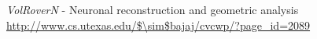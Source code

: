 \documentclass[margin,line]{res}
\begin{document}
\begin{resume}
\emph{VolRoverN} - Neuronal reconstruction and geometric analysis\\
\url{http://www.cs.utexas.edu/$\sim$bajaj/cvcwp/?page\_id=2089}


%
%
%
%
%
%
%
%
%

\end{resume}
\end{document}
